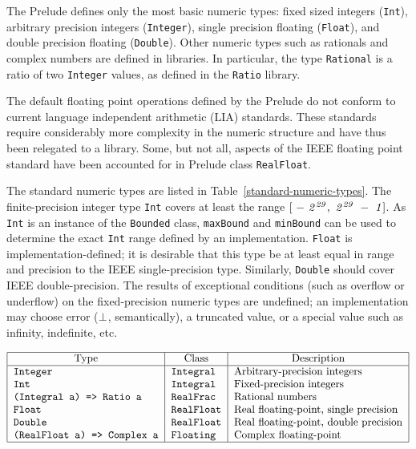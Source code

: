 The Prelude defines only the most basic numeric types: fixed sized
integers (\mbox{\tt Int}), arbitrary precision integers (\mbox{\tt Integer}), single
precision floating (\mbox{\tt Float}), and double precision floating
(\mbox{\tt Double}).  Other numeric types such as rationals and complex numbers
are defined in libraries.  In particular, the type \mbox{\tt Rational} is a
ratio of two \mbox{\tt Integer} values, as defined in the \mbox{\tt Ratio}
library.  

The default floating point operations defined by the \Haskell{}
Prelude do not 
conform to current language independent arithmetic (LIA) standards.  These
standards require considerably more complexity in the numeric
structure and have thus been relegated to a library.  Some, but not
all, aspects of the IEEE floating point standard have been
accounted for in Prelude class \mbox{\tt RealFloat}.

The standard numeric types are listed in Table~\ref{standard-numeric-types}.
The finite-precision integer type \mbox{\tt Int} covers at
least the range 
\mbox{$\it [\ -\ 2^{29},\ 2^{29}\ -\ 1]\/$}.  As \mbox{\tt Int} is an instance of the \mbox{\tt Bounded}
class, \mbox{\tt maxBound} and \mbox{\tt minBound} can be used to determine the exact
\mbox{\tt Int} range defined by an implementation.
\mbox{\tt Float} is implementation-defined; it is desirable that
this type be at least equal in range and precision to the IEEE
single-precision type.  Similarly, \mbox{\tt Double} should
cover IEEE double-precision.  The results of exceptional
conditions (such as overflow or underflow) on the fixed-precision
numeric types are undefined; an implementation may choose error
(\mbox{$\it \bot$}, semantically), a truncated value, or a special value such as
infinity, indefinite, etc.

\begin{table}[tb]
\[
\bto{|l|l|l|}
\hline
\multicolumn{1}{|c|}{Type} & 
        \multicolumn{1}{c|}{Class} &
        \multicolumn{1}{c|}{Description} \\ \hline
\mbox{\tt Integer} & \mbox{\tt Integral} & Arbitrary-precision integers \\
\mbox{\tt Int} & \mbox{\tt Integral} & Fixed-precision integers \\
\mbox{\tt (Integral\ a)\ =>\ Ratio\ a} & \mbox{\tt RealFrac} & Rational numbers \\
\mbox{\tt Float} & \mbox{\tt RealFloat} & Real floating-point, single precision \\
\mbox{\tt Double} & \mbox{\tt RealFloat} & Real floating-point, double precision \\
\mbox{\tt (RealFloat\ a)\ =>\ Complex\ a} & \mbox{\tt Floating} & Complex floating-point \\
\hline
\eto
\]
\label{standard-numeric-types}
\end{table}

